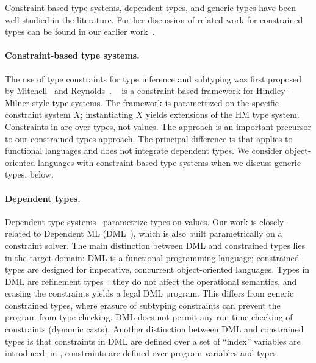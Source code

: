 Constraint-based type systems, dependent types, and generic types
have been well studied in the literature.
Further discussion of
related work for constrained types can be found in our earlier
work~\cite{constrained-types}.

\paragraph{Constraint-based type systems.}

The use of type constraints for type inference and subtyping was
first proposed by
Mitchell~\cite{mitchell84} and 
Reynolds~\cite{reynolds85}.  
\hmx~\cite{sulzmann97type} is a constraint-based framework for
Hindley--Milner-style type systems.  The framework is parametrized on
the specific constraint system $X$; instantiating $X$ yields
extensions of the HM type system.  Constraints in \hmx{} are over
types, not values. The \hmx{} approach is an important precursor to
our constrained types approach. The principal difference is that
\hmx{} applies to functional languages and does not integrate
dependent types.
We consider object-oriented languages with constraint-based type systems when 
we discuss generic types, below.


\paragraph{Dependent types.}

Dependent type
systems~\cite{xi99dependent,epigram,cayenne}
param\-etrize types on values.
Our work is closely related to Dependent ML (DML~\cite{xi99dependent}), which
is also built
parametrically on a constraint solver.
The main distinction between DML and constrained types
lies in the target
domain: DML is a functional programming language;
constrained types are designed for imperative, concurrent
object-oriented languages. 
Types in DML are refinement types~\cite{refinement-types}:
they do not affect the operational semantics, and erasing the
constraints yields a legal DML program.  This differs from
generic constrained
types, where erasure of subtyping constraints can prevent the program from
type-checking.
DML does not permit any run-time checking of constraints
(dynamic casts).
Another distinction between DML and constrained types
is that constraints in DML are
defined over a set of ``index'' variables are introduced; in \Xten, constraints
are defined over program variables and types.

